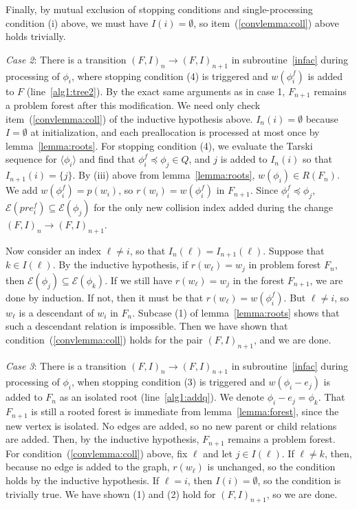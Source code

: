 \documentclass[11pt,reqno]{amsart}
\theoremstyle{definition}
\numberwithin{equation}{section}
\newcommand{\lag}{\langle}
\newcommand{\rag}{\rangle}
\newcommand{\pre}{\phi}
\newcommand{\sub}{\subseteq}
\newcommand{\fix}{\mathcal{E}}
\newcommand{\peq}{\preceq}
\newcommand{\act}{Q}
\newcommand{\coll}{I}
\newcommand{\forest}{F}
\newcommand{\pair}{(F,I)}
\newcommand{\roott}{R}
\begin{document}
\begin{enumerate}
Finally, by mutual exclusion of stopping conditions and single-processing condition (i) above, we must have $\coll(i) = \emptyset$, so item~(\ref{convlemma:coll}) above holds trivially.

\emph{Case 2}: There is a transition $\pair_n \to \pair_{n +1}$ in subroutine~\ref{infac} during processing of $\pre_i$, where stopping condition (4) is triggered and $w(\pre_i^f)$ is added to $\forest$ (line~\ref{alg1:tree2}). 
By the exact same arguments as in case 1, $F_{n + 1}$ remains a problem forest after this modification. 
We need only check item~(\ref{convlemma:coll}) of the inductive hypothesis above.
$\coll_n(i) = \emptyset$ because $I = \emptyset$ at initialization, and each preallocation is processed at most once by lemma~\ref{lemma:roots}.
For stopping condition (4), we evaluate the Tarski sequence for $\lag \pre_i \rag$ and find that $\pre_i^f \peq \pre_j \in \act$, and $j$ is added to $I_n(i)$ so that $I_{n + 1}(i) = \{j\}$. 
By (iii) above from lemma~\ref{lemma:roots}, $w(\pre_i) \in \roott(\forest_n)$. 
We add $w(\pre_i^f) = p(w_i)$, so $r(w_i) = w(\pre_i^f)$ in $\forest_{n+1}$. 
Since $\pre_i^f \peq \pre_j$, $\fix(pre_i^f) \sub \fix(\pre_j)$ for the only new collision index added during the change $\pair_n \to \pair_{n+1}$.

Now consider an index $\ell \not = i$, so that $\coll_n(\ell) = \coll_{n + 1}(\ell)$. 
Suppose that $k \in \coll(\ell)$. 
By the inductive hypothesis, if $r(w_{\ell}) = w_j$ in problem forest $\forest_n$, then $\fix(\pre_j) \sub \fix(\pre_k)$. 
If we still have $r(w_{\ell}) = w_j$ in the forest $\forest_{n+1}$, we are done by induction. 
If not, then it must be that $r(w_{\ell}) = w(\pre_i^f)$. 
But $\ell \not = i$, so $w_{\ell}$ is a descendant of $w_i$ in $\forest_n$.
Subcase (1) of lemma~\ref{lemma:roots} shows that such a descendant relation is impossible. 
Then we have shown that condition~(\ref{convlemma:coll}) holds for the pair $\pair_{n + 1}$, and we are done. 

\emph{Case 3}: There is a transition $\pair_n \to \pair_{n +1}$ in subroutine~\ref{infac} during processing of $\pre_i$, when stopping condition (3) is triggered and $w(\pre_i - e_j)$ is added to $\forest_n$ as an isolated root (line~\ref{alg1:addq}). 
We denote $\pre_i - e_j = \pre_k$.
That $\forest_{n + 1}$ is still a rooted forest is immediate from lemma~\ref{lemma:forest}, since the new vertex is isolated.
No edges are added, so no new parent or child relations are added. 
Then, by the inductive hypothesis, $\forest_{n + 1}$ remains a problem forest.
For condition~(\ref{convlemma:coll}) above, fix $\ell$ and let $j \in \coll(\ell)$.
If $\ell \not = k$, then, because no edge is added to the graph, $r(w_{\ell})$ is unchanged, so the condition holds by the inductive hypothesis. 
If $\ell = i$, then $\coll(i) = \emptyset$, so the condition is trivially true. 
We have shown (1) and (2) hold for $\pair_{n + 1}$, so we are done.


\end{enumerate}
\end{document}
